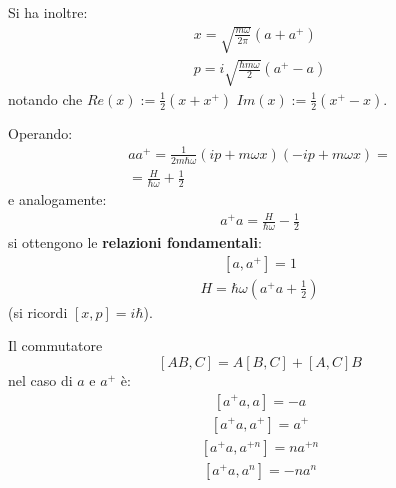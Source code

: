 Si ha inoltre:
\begin{equation}\begin{split}
x=\sqrt{\frac{m\omega }{2\pi }}\left(a+a^+\right)\\
p=i\sqrt{\frac{\hbar m\omega }{2}}\left(a^+-a\right)
\end{split}\end{equation}
notando che $Re (x):=\frac{1}{2}\left(x+x^+\right)$ $Im (x):=\frac{1}{2}\left(x^+-x\right)$.

Operando:
\begin{equation}\begin{split}
aa^+=\frac{1}{2m\hbar \omega }\left(ip+m\omega x\right)\left(-ip+m\omega x\right)=\\
=\frac{H}{\hbar \omega }+\frac{1}{2}
\end{split}\end{equation}
e analogamente:
\begin{equation}\begin{split}
a^+a=\frac{H}{\hbar \omega }-\frac{1}{2}
\end{split}\end{equation}
si ottengono le \textbf{relazioni fondamentali}:
\begin{equation}\begin{split}
\left[a,a^+\right]=1
\end{split}\end{equation}
\begin{equation}\begin{split}
H=\hbar \omega \left(a^+a+\frac{1}{2}\right)
\end{split}\end{equation}
(si ricordi $\left[x,p\right]=i\hbar $).

Il commutatore
\begin{equation}
\left[AB,C\right]=A\left[B,C\right]+\left[A,C\right]B
\end{equation}
nel caso di $a$ e $a^+$ è:
\begin{equation}\begin{split}
\left[a^+a,a\right]=-a
\end{split}\end{equation}
\begin{equation}\begin{split}
\left[a^+a,a^+\right]=a^+
\end{split}\end{equation}
\begin{equation}\begin{split}
\left[a^+a,a^{+n}\right]=na^{+n}
\end{split}\end{equation}
\begin{equation}\begin{split}
\left[a^+a,a^n\right]=-na^n
\end{split}\end{equation}

